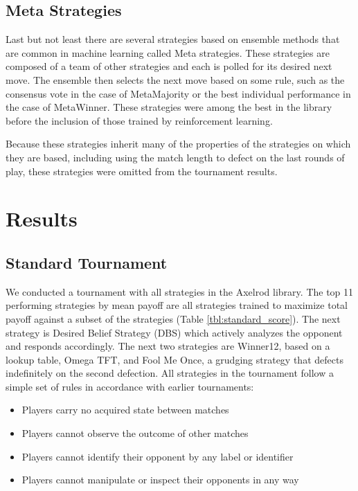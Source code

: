 \documentclass{article}
\begin{document}
\subsection{Meta Strategies}

Last but not least there are several strategies based on ensemble methods that
are common in machine learning called Meta strategies. These strategies are
composed of a team of other strategies and each is polled for its desired next
move. The ensemble then selects the next move based on some rule, such as the
consensus vote in the case of MetaMajority or the best individual performance
in the case of MetaWinner. These strategies were among the best in the library
before the inclusion of those trained by reinforcement learning.

Because these strategies inherit many of the properties of the strategies
on which they are based, including using the match length to defect on the last
rounds of play, these strategies were omitted from the tournament results.

\section{Results}

\subsection{Standard Tournament}

We conducted a tournament with all strategies in the Axelrod library. The top
11 performing strategies by mean payoff are all strategies trained to maximize
total payoff against a subset of the strategies (Table \ref{tbl:standard_score}).
The next strategy is
Desired Belief Strategy (DBS) which actively analyzes the opponent and responds
accordingly. The next two strategies are Winner12, based on a lookup table,
Omega TFT, and Fool Me Once, a grudging strategy that defects indefinitely on
the second defection. All strategies in the tournament follow a simple set of
rules in accordance with earlier tournaments:
\begin{itemize}
  \item Players carry no acquired state between matches
  \item Players cannot observe the outcome of other matches
  \item Players cannot identify their opponent by any label or identifier
  \item Players cannot manipulate or inspect their opponents in any way
\end{itemize}
\end{document}
